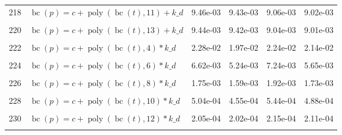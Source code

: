 \documentclass[12pt,a4paper]{article}
\DeclareMathOperator{\bc}{bc}
\DeclareMathOperator{\poly}{poly}
\begin{document}
\begin{longtable}[t]{ll>{\raggedleft\arraybackslash}p{2cm}>{\raggedleft\arraybackslash}p{2cm}>{\raggedleft\arraybackslash}p{2cm}>{\raggedleft\arraybackslash}p{2cm}}
218 & $\bc(p) = c + \poly\left( \bc(t), 11 \right) + k\_d$ & 9.46e-03 & 9.43e-03 & 9.06e-03 & 9.02e-03\\
\cellcolor{gray!6}{219} & \cellcolor{gray!6}{$\bc(p) = c + \poly\left( \bc(t), 12 \right) + k\_d$} & \cellcolor{gray!6}{9.45e-03} & \cellcolor{gray!6}{9.42e-03} & \cellcolor{gray!6}{9.04e-03} & \cellcolor{gray!6}{9.01e-03}\\
220 & $\bc(p) = c + \poly\left( \bc(t), 13 \right) + k\_d$ & 9.44e-03 & 9.42e-03 & 9.04e-03 & 9.01e-03\\
\cellcolor{gray!6}{221} & \cellcolor{gray!6}{$\bc(p) = c + \poly\left( \bc(t), 3 \right) * k\_d$} & \cellcolor{gray!6}{3.51e-02} & \cellcolor{gray!6}{1.66e-02} & \cellcolor{gray!6}{1.88e-02} & \cellcolor{gray!6}{1.77e-02}\\
222 & $\bc(p) = c + \poly\left( \bc(t), 4 \right) * k\_d$ & 2.28e-02 & 1.97e-02 & 2.24e-02 & 2.14e-02\\
\cellcolor{gray!6}{223} & \cellcolor{gray!6}{$\bc(p) = c + \poly\left( \bc(t), 5 \right) * k\_d$} & \cellcolor{gray!6}{7.41e-03} & \cellcolor{gray!6}{7.39e-03} & \cellcolor{gray!6}{7.35e-03} & \cellcolor{gray!6}{7.34e-03}\\
224 & $\bc(p) = c + \poly\left( \bc(t), 6 \right) * k\_d$ & 6.62e-03 & 5.24e-03 & 7.24e-03 & 5.65e-03\\
\cellcolor{gray!6}{225} & \cellcolor{gray!6}{$\bc(p) = c + \poly\left( \bc(t), 7 \right) * k\_d$} & \cellcolor{gray!6}{3.12e-03} & \cellcolor{gray!6}{2.63e-03} & \cellcolor{gray!6}{2.93e-03} & \cellcolor{gray!6}{2.67e-03}\\
226 & $\bc(p) = c + \poly\left( \bc(t), 8 \right) * k\_d$ & 1.75e-03 & 1.59e-03 & 1.92e-03 & 1.73e-03\\
\cellcolor{gray!6}{227} & \cellcolor{gray!6}{$\bc(p) = c + \poly\left( \bc(t), 9 \right) * k\_d$} & \cellcolor{gray!6}{1.53e-03} & \cellcolor{gray!6}{1.41e-03} & \cellcolor{gray!6}{1.67e-03} & \cellcolor{gray!6}{1.53e-03}\\
228 & $\bc(p) = c + \poly\left( \bc(t), 10 \right) * k\_d$ & 5.04e-04 & 4.55e-04 & 5.44e-04 & 4.88e-04\\
\cellcolor{gray!6}{229} & \cellcolor{gray!6}{$\bc(p) = c + \poly\left( \bc(t), 11 \right) * k\_d$} & \cellcolor{gray!6}{4.89e-04} & \cellcolor{gray!6}{4.39e-04} & \cellcolor{gray!6}{5.30e-04} & \cellcolor{gray!6}{4.72e-04}\\
230 & $\bc(p) = c + \poly\left( \bc(t), 12 \right) * k\_d$ & 2.05e-04 & 2.02e-04 & 2.15e-04 & 2.11e-04\\
\cellcolor{gray!6}{231} & \cellcolor{gray!6}{$\bc(p) = c + \poly\left( \bc(t), 13 \right) * k\_d$} & \cellcolor{gray!6}{2.12e-04} & \cellcolor{gray!6}{2.04e-04} & \cellcolor{gray!6}{2.26e-04} & \cellcolor{gray!6}{2.17e-04}\\*
\end{longtable}
\endgroup{}
\end{document}

